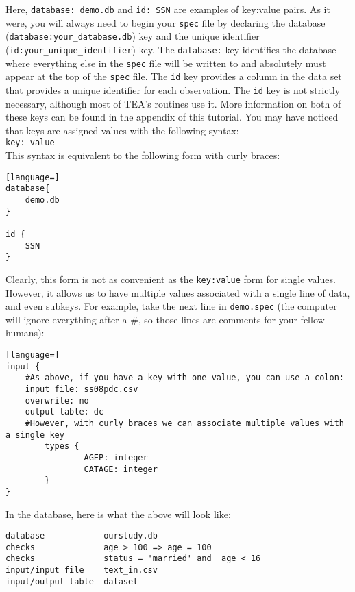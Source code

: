 \documentclass{article}
\begin{document}
Here, {\tt database: demo.db} and {\tt id: SSN} are examples of key:value pairs.
As it were, you will always need to begin your {\tt spec} file by declaring the 
database ({\tt database:your\_database.db}) key and the unique identifier 
({\tt id:your\_unique\_identifier}) key. The {\tt database:} key identifies 
the database where everything else in the {\tt spec} file will be written to and 
absolutely must appear at the top of the {\tt spec} file.
The {\tt id} key provides a column in the data set that provides a unique 
identifier for each observation. The {\tt id} key is not strictly necessary, 
although most of TEA's routines use it. More information on both of these keys can 
be found in the appendix of this tutorial.
You may have noticed that keys are assigned values with the following syntax:\\
{\tt key: value}\\
This syntax is equivalent to the following form with curly braces:
\begin{lstlisting}[language=]
database{
	demo.db
}

id {
	SSN
}
\end{lstlisting}
Clearly, this form is not as convenient as the {\tt key:value} form for single values. 
However, it allows us to have multiple values associated with a single line of data, 
and even subkeys. For example, take the next line in {\tt demo.spec} (the computer will 
ignore everything after a #, so those lines are comments for your fellow humans):

\begin{lstlisting}[language=]
input {
    #As above, if you have a key with one value, you can use a colon:
    input file: ss08pdc.csv
    overwrite: no
    output table: dc
	#However, with curly braces we can associate multiple values with a single key
        types {
                AGEP: integer
                CATAGE: integer
        }
}
\end{lstlisting}


In the database, here is what the above will look like:
\begin{verbatim}
database            ourstudy.db
checks              age > 100 => age = 100
checks              status = 'married' and  age < 16
input/input file    text_in.csv
input/output table  dataset
\end{verbatim}
\end{document}
